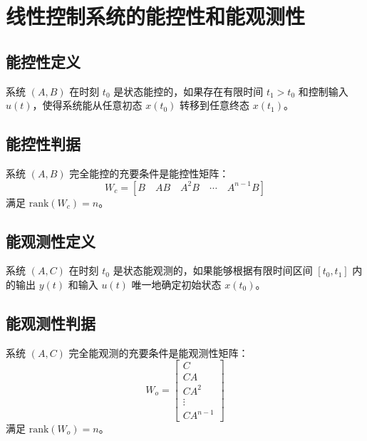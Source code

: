 \section{线性控制系统的能控性和能观测性}

\subsection{能控性定义}
系统 $(A, B)$ 在时刻 $t_0$ 是状态能控的，如果存在有限时间 $t_1 > t_0$ 和控制输入 $u(t)$，使得系统能从任意初态 $x(t_0)$ 转移到任意终态 $x(t_1)$。

\subsection{能控性判据}
系统 $(A, B)$ 完全能控的充要条件是能控性矩阵：
\[W_c = [B \quad AB \quad A^2B \quad \cdots \quad A^{n-1}B]\]
满足 $\text{rank}(W_c) = n$。

\subsection{能观测性定义}
系统 $(A, C)$ 在时刻 $t_0$ 是状态能观测的，如果能够根据有限时间区间 $[t_0, t_1]$ 内的输出 $y(t)$ 和输入 $u(t)$ 唯一地确定初始状态 $x(t_0)$。

\subsection{能观测性判据}
系统 $(A, C)$ 完全能观测的充要条件是能观测性矩阵：
\[W_o = \begin{bmatrix}
C \\ CA \\ CA^2 \\ \vdots \\ CA^{n-1}
\end{bmatrix}\]
满足 $\text{rank}(W_o) = n$。

